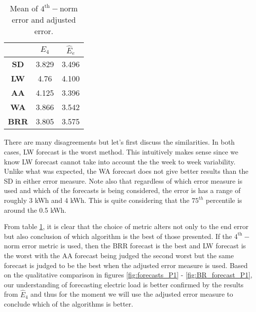 \documentclass[a4paper]{article}
\begin{document}
\begin{table}
\centering
\begin{tabular}{|c|c|c|}
\hline
 & $E_4$ & $\hat{E}_e$ \\
 \hline
\textbf{SD} & 3.829 & 3.496 \\
\textbf{LW} & 4.76 & 4.100 \\ 
\textbf{AA} & 4.125 & 3.396 \\ 
\textbf{WA} & 3.866 & 3.542 \\ 
\textbf{BRR} & 3.805 & 3.575 \\
\hline
\end{tabular}
\caption{Mean of $4^{\text{th}}-$norm error and adjusted error.}
\label{tab:errs}
\end{table}

There are many disagreements but let's first discuss the similarities. In both cases, LW forecast is the worst method. This intuitively makes sense since we know LW forecast cannot take into account the the week to week variability. Unlike what was expected, the WA forecast does not give better results than the SD in either error measure. Note also that regardless of which error measure is used and which of the forecasts is being considered, the error is has a range of roughly 3 kWh and 4 kWh. This is quite considering that the $75^{th}$ percentile is around the 0.5 kWh.

From table \ref{tab:errs}, it is clear that the choice of metric alters not only to the end error but also conclusion of which algorithm is the best of those presented. If the $4^{\text{th}}-$norm error metric is used, then the BRR forecast is the best and LW forecast is the worst with the AA forecast being judged the second worst but the same forecast is judged to be the best when the adjusted error measure is used. Based on the qualitative comparison in figures \ref{fig:forecasts_P1} - \ref{fig:BR_forecast_P1}, our understanding of forecasting electric load is better confirmed by the results from $\hat{E}_4$ and thus for the moment we will use the adjusted error measure to conclude which of the algorithms is better. 

%
%
\end{document}
